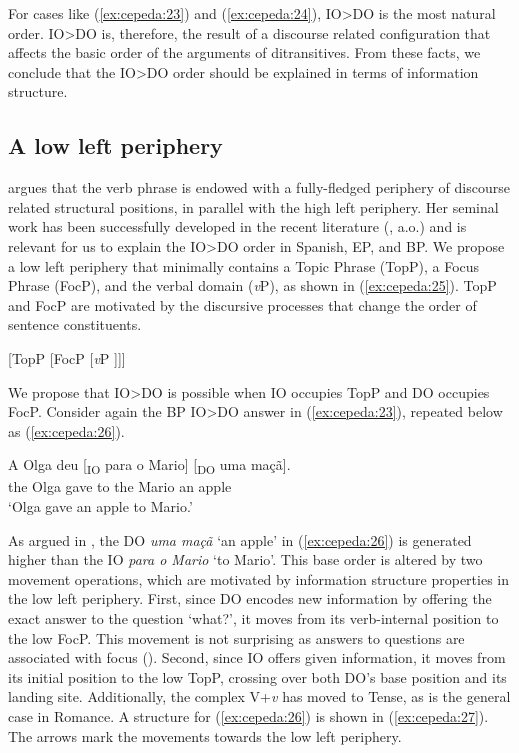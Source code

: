 \documentclass[output=paper,colorlinks,citecolor=brown,nonflat]{./langscibook}
\begin{document}
For cases like (\ref{ex:cepeda:23}) and (\ref{ex:cepeda:24}), IO>DO is the most natural order. IO>DO is, therefore, the result of a discourse related configuration that affects the basic order of the arguments of ditransitives. From these facts, we conclude that the IO>DO order should be explained in terms of information structure.

\subsection{A low left periphery}\label{sec:cepeda:3.2}

\citet{Belletti2004Chapter} argues that the verb phrase is endowed with a fully-fledged periphery of discourse related structural positions, in parallel with the high left periphery. Her seminal work has been successfully developed in the recent literature (\citealt{Mioto2003, Quarezemin2005, Jiménez-Fernández2009}, a.o.) and is relevant for us to explain the IO>DO order in Spanish, EP, and BP. We propose a low left periphery that minimally contains a Topic Phrase (TopP), a Focus Phrase (FocP), and the verbal domain (\textit{v}P), as shown in (\ref{ex:cepeda:25}). TopP and FocP are motivated by the discursive processes that change the order of sentence constituents.

\ea%
    \label{ex:cepeda:25}{}
	[TopP [FocP [\textit{v}P ]]]
\z

We propose that IO>DO is possible when IO occupies TopP and DO occupies FocP. Consider again the BP IO>DO answer in (\ref{ex:cepeda:23}), repeated below as (\ref{ex:cepeda:26}).

\ea%
    \label{ex:cepeda:26}
	\gll A   Olga deu [\textsubscript{IO} para o   Mario] [\textsubscript{DO} uma maçã].\\
		the Olga gave \hspaceThis{[\textsubscript{IO}} to the Mario  \hspaceThis{[\textsubscript{DO}} an apple\\
	\glt ‘Olga gave an apple to Mario.’
\z

As argued in , the DO \textit{uma maçã} ‘an apple’ in (\ref{ex:cepeda:26}) is generated higher than the IO \textit{para o Mario} ‘to Mario’. This base order is altered by two movement operations, which are motivated by information structure properties in the low left periphery. First, since DO encodes new information by offering the exact answer to the question ‘what?’, it moves from its verb-internal position to the low FocP. This movement is not surprising as answers to questions are associated with focus (\citealt{Rooth1992}). Second, since IO offers given information, it moves from its initial position to the low TopP, crossing over both DO’s base position and its landing site. Additionally, the complex V+\textit{v} has moved to Tense, as is the general case in Romance. A structure for (\ref{ex:cepeda:26}) is shown in (\ref{ex:cepeda:27}). The arrows mark the movements towards the low left periphery.
\end{document}
